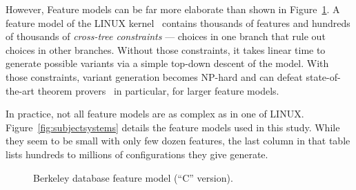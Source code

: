 \documentclass{sig-alternative}
\newcommand{\fig}[1]{Figure~\ref{fig:#1}}
\begin{document}
However, Feature models can be far more elaborate than shown in \fig{bdbc}. 
A feature model of the LINUX kernel~\cite{sayyad13b} contains thousands of features and hundreds of thousands of  {\em cross-tree constraints} --- choices in one branch that rule out choices in other branches. 
Without those constraints, it takes linear time to generate possible variants via a simple
top-down descent of the model. With those constraints, variant generation becomes NP-hard and can
 defeat state-of-the-art theorem provers~\cite{pohl11} in particular, for larger feature models.
 
 
 
In practice, not all feature models are as complex as in one of LINUX.
\fig{subjectsystems} details the feature models used in this study. While
they seem to be small with only few dozen features, the last column in that table lists hundreds
to millions of configurations they give generate.



\begin{figure}[!tb]
\caption{ Berkeley database feature model   (``C'' version). }\label{fig:bdbc}
\end{figure}
    
\end{document}
